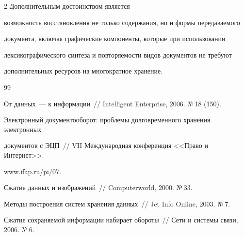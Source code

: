 \begin{multicols}{2}
Дополнительным достоинством является 


возможность восстановления не только содержания, но и формы передаваемого 


документа, включая графические компоненты, которые при использовании 


лексикографического синтеза и по\-вто\-ря\-емости видов документов не требуют 


дополнительных ресурсов на многократное хранение.





{\small\frenchspacing


{%




\begin{thebibliography}{99}    









От данных~--- к информации~// Intelligent Enterprise, 2006. №\,18 (150).









Электронный документооборот: проб\-ле\-мы долговременного хранения электронных 


документов с ЭЦП~// VII Международная конференция <<Право и Интернет>>. 


{\sf www.ifap.ru/pi/07}.









Сжатие данных и изображений~// Computerworld, 2000. №\,33.









Методы построения систем хранения данных~// Jet Info Online, 2003. №\,7.









Сжатие сохраняемой информации набирает обороты~// Сети и системы связи, 2006. №\,6.






\end{thebibliography}}}
\end{multicols}
